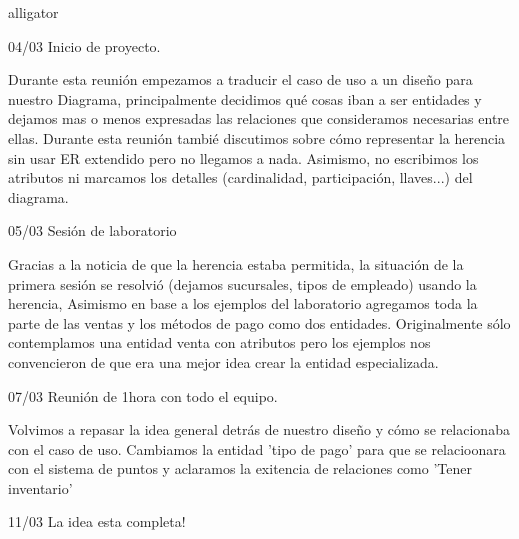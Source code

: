 \documentclass[10pt]{article}
\begin{document}
	\begin{labeling}{alligator}
		\item [04/03] Inicio de proyecto.
            
            Durante esta reunión empezamos a traducir el caso de uso a un diseño para
            nuestro Diagrama, principalmente decidimos qué cosas iban a ser entidades y
            dejamos mas o menos expresadas las relaciones que consideramos necesarias
            entre ellas. Durante esta reunión tambié discutimos sobre cómo representar la
            herencia sin usar ER extendido pero no llegamos a nada. Asimismo, no escribimos
            los atributos ni marcamos los detalles (cardinalidad, participación, llaves...) del
            diagrama.
            
		\item [05/03] Sesión de laboratorio
		
            Gracias a la noticia de que la herencia estaba permitida, la situación de la primera 
            sesión se resolvió (dejamos sucursales, tipos de empleado) usando la herencia,
            Asimismo en base a los ejemplos del laboratorio agregamos toda la parte de las
            ventas y los métodos de pago como dos entidades. Originalmente sólo
            contemplamos una entidad venta con atributos pero los ejemplos nos convencieron
            de que era una mejor idea crear la entidad especializada. 
    
		\item [07/03] Reunión de 1hora con todo el equipo.
		
            Volvimos a repasar la idea general detrás de nuestro diseño y cómo se relacionaba
            con el caso de uso. Cambiamos la entidad 'tipo de pago' para que se relacioonara
            con el sistema de puntos y aclaramos la exitencia de relaciones como 'Tener
            inventario'
		\item [11/03] La idea esta completa!
	\end{labeling}
	
	
	
\end{document}
